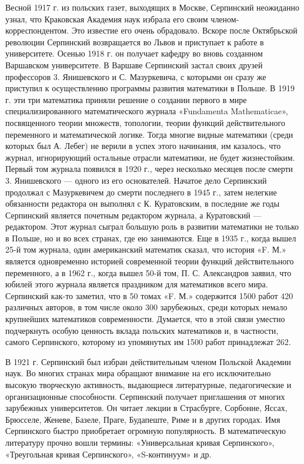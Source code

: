 \documentclass[12pt, a4paper, openany]{book}
\begin{document}
Весной 1917 г. из польских газет, выходящих в Москве, Серпинский неожиданно узнал, что Краковская Академия наук избрала его своим членом-корреспондентом. Это известие его очень обрадовало. Вскоре после Октябрьской революции Серпинский возвращается во Львов и приступает к работе в университете. Осенью 1918 г. он получает кафедру во вновь созданном Варшавском университете. В Варшаве Серпинский застал своих друзей профессоров 3. Янишевского и С. Мазуркевича, с которыми он сразу же приступил к осуществлению программы развития математики в Польше. В 1919 г. эти три математика приняли решение о создании первого в мире специализированного математического журнала «Fundamenta Mathematicae», посвященного теории множеств, топологии, теории функций действительного переменного и математической логике. Тогда многие видные математики (среди которых был А. Лебег) не верили в успех этого начинания, им казалось, что журнал, игнорирующий остальные отрасли математики, не будет жизнестойким. Первый том журнала появился в 1920 г., через несколько месяцев после смерти 3. Янишевского — одного из его основателей. Начатое дело Серпинский продолжал с Мазуркевичем до смерти последнего в 1945 г., затем нелегкие обязанности редактора он выполнял с К. Куратовским, в последние же годы Серпинский является почетным редактором журнала, а Куратовский — редактором. Этот журнал сыграл большую роль в развитии математики не только в Польше, но и во всех странах, где ею занимаются. Еще в 1935 г., когда вышел 25-й том журнала, один американский математик сказал, что история «F. М.» является одновременно историей современной теории функций действительного переменного, а в 1962 г., когда вышел 50-й том, П. С. Александров заявил, что юбилей этого журнала является праздником для математиков всего мира. Серпинский как-то заметил, что в 50 томах «F. М.» содержится 1500 работ 420 различных авторов, в том числе около 300 зарубежных, среди которых немало крупнейших математиков современности. Думается, что в этой связи уместно подчеркнуть особую ценность вклада польских математиков и, в частности, самого Серпинского, которому из упомянутых им 1500 работ принадлежат 262.

В 1921 г. Серпинский был избран действительным членом Польской Академии наук. Во многих странах мира обращают внимание на его исключительно высокую творческую активность, выдающиеся литературные, педагогические и организационные способности. Серпинский получает приглашения от многих зарубежных университетов. Он читает лекции в Страсбурге, Сорбонне, Яссах, Брюсселе, Женеве, Базеле, Праге, Будапеште, Риме и в других городах. Имя Серпинского быстро приобретает огромную популярность. В математическую литературу прочно вошли термины: «Универсальная кривая Серпинского», «Треугольная кривая Серпинского», «S-континуум» и др.
\end{document}
